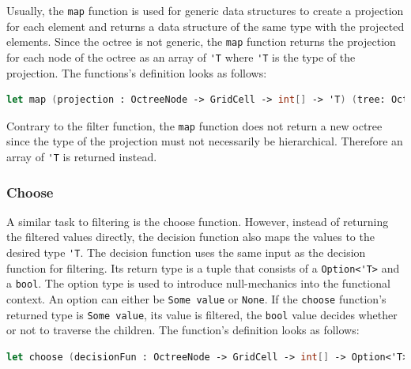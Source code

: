 Usually, the \verb|map| function is used for generic data structures to create a projection for each element and returns a data structure of the same type with the projected elements. Since the octree is not generic, the \verb|map| function returns the projection for each node of the octree as an array of \verb|'T| where \verb|'T| is the type of the projection. 
The functions's definition looks as follows: 

\begin{lstlisting}[language = FSharp]
let map (projection : OctreeNode -> GridCell -> int[] -> 'T) (tree: Octree) : ('T[])= ...
\end{lstlisting}

Contrary to the filter function, the \verb|map| function does not return a new octree since the type of the projection must not necessarily be hierarchical. Therefore an array of \verb|'T| is returned instead. 


\subsubsection{Choose}

A similar task to filtering is the choose function. However, instead of returning the filtered values directly, the decision function also maps the values to the desired type \verb|'T|. The decision function uses the same input as the decision function for filtering. Its return type is a tuple that consists of a \verb|Option<'T>| and a \verb|bool|. The option type is used to introduce null-mechanics into the functional context. An option can either be \verb|Some value| or \verb|None|. If the \verb|choose| function's returned type is \verb|Some value|, its value is filtered, the \verb|bool| value decides whether or not to traverse the children. 
The function's definition looks as follows: 

\begin{lstlisting}[language = FSharp]
let choose (decisionFun : OctreeNode -> GridCell -> int[] -> Option<'T>*bool) (tree: Octree) :('T[]) = ...
\end{lstlisting}


